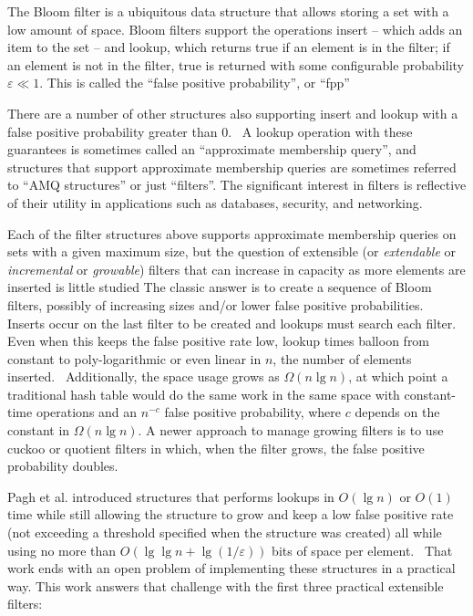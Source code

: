 \documentclass[sigconf, nonacm]{acmart}
\newcommand{\etal}{et al.}
\begin{document}
The Bloom filter is a ubiquitous data structure that allows storing a set with a low amount of space.
Bloom filters support the operations insert -- which adds an item to the set -- and lookup, which returns true if an element is in the filter; if an element is not in the filter, true is returned with some configurable probability $\varepsilon \ll 1$.
This is called the ``false positive probability'', or ``fpp''

There are a number of other structures also supporting insert and lookup with a false positive probability greater than 0.~\cite{vacuum,morton-journal,ribbon,xor-filter,quotient-filter,broom,vector-quotient}
A lookup operation with these guarantees is sometimes called an ``approximate membership query'', and structures that support approximate membership queries are sometimes referred to ``AMQ structures'' or just ``filters''.
The significant interest in filters is reflective of their utility in applications such as databases, security, and networking.~\cite{split-bloom,vacuum,quotient-filter,malware,profile-similarity,invertible}

Each of the filter structures above supports approximate membership queries on sets with a given maximum size, but the question of extensible (or {\itshape extendable} or {\itshape incremental} or {\itshape growable}) filters that can increase in capacity as more elements are inserted is little studied
The classic answer is to create a sequence of Bloom filters, possibly of increasing sizes and/or lower false positive probabilities.~\cite{dynamic-bloom,scalable-bloom}
Inserts occur on the last filter to be created and lookups must search each filter.
Even when this keeps the false positive rate low, lookup times balloon from constant to poly-logarithmic or even linear in $n$, the number of elements inserted.~\cite{psw,logarithm,consistent-cuckoo} %
Additionally, the space usage grows as $\Omega(n \lg n)$, at which point a traditional hash table would do the same work in the same space with constant-time operations and an $n^{-c}$ false positive probability, where $c$ depends on the constant in $\Omega(n \lg n)$.
A newer approach to manage growing filters is to use cuckoo or quotient filters in which, when the filter grows, the false positive probability doubles.~\cite{logarithm,morton-journal,vacuum,rsqf}


Pagh \etal{} introduced structures that performs lookups in $O(\lg n)$ or $O(1)$ time while still allowing the structure to grow and keep a low false positive rate (not exceeding a threshold specified when the structure was created) all while using no more than $O(\lg \lg n + \lg (1/\varepsilon))$ bits of space per element.~\cite{psw}
That work ends with an open problem of implementing these structures in a practical way.
This work answers that challenge with the first three practical extensible filters:
\end{document}
